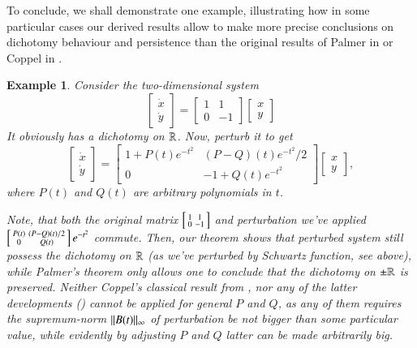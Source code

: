 \documentclass{elsarticle}
\newtheorem{example}{\indent Example}[section]
\theoremstyle{remark}
\begin{document}
To conclude, we shall demonstrate one example, illustrating how in some particular cases
our derived results allow to make more precise conclusions on dichotomy behaviour and persistence than
the original results of Palmer in
\cite{palmer1984exponential} or Coppel in \cite{coppel1978dichotomies}.
\begin{example}
	Consider the two-dimensional system
	\[\begin{bmatrix}\dot{x}\\\dot{y}\end{bmatrix}=
		\begin{bmatrix}1&1\\0&-1\end{bmatrix}
	\begin{bmatrix}{x}\\{y}\end{bmatrix}\]
	It obviously has a dichotomy on $\mathbb{R}$. Now, perturb it to get
	\[\begin{bmatrix}\dot{x}\\\dot{y}\end{bmatrix}=
		\begin{bmatrix}1+P(t)e^{-t^2}&(P-Q)(t)e^{-t^2}/2\\0&-1+Q(t)e^{-t^2}\end{bmatrix}
	\begin{bmatrix}{x}\\{y}\end{bmatrix},\]
	where $P(t)$ and $Q(t)$ are arbitrary polynomials in $t$.

	Note, that both the original matrix $\left[\begin{smallmatrix}1&1\\0&-1\end{smallmatrix}\right]$ and perturbation we've applied
	$\left[\begin{smallmatrix}P(t)&(P-Q)(t)/2\\0&Q(t)\end{smallmatrix}\right]e^{-t^2}$ commute.
	Then, our theorem shows that perturbed system still possess the dichotomy on $\mathbb{R}$ (as we've perturbed by Schwartz function, see above),
	while Palmer's theorem only allows one to conclude that the dichotomy on $\pm\mathbb{R}$ is preserved. Neither Coppel's classical result
	from \cite{coppel1978dichotomies}, nor any of the latter developments (\cite{Ju200139,Naulin1998559}) \textit{cannot} be applied
	for general $P$ and $Q$,
	as any of them requires the supremum-norm $\|B(t)\|_\infty$ of perturbation be not bigger than some particular value,
	while evidently by adjusting $P$ and $Q$ latter can be made arbitrarily big.
\end{example}
\end{document}
